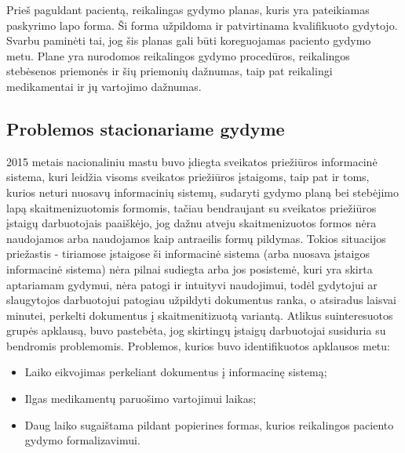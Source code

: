 Prieš paguldant pacientą, reikalingas gydymo planas, kuris yra pateikiamas paskyrimo lapo forma. Ši forma užpildoma ir patvirtinama kvalifikuoto gydytojo. Svarbu paminėti tai, jog šis planas gali būti koreguojamas paciento gydymo metu. Plane yra nurodomos reikalingos gydymo procedūros, reikalingos stebėsenos priemonės ir šių priemonių dažnumas, taip pat reikalingi medikamentai ir jų vartojimo dažnumas. 
\subsection{Problemos stacionariame gydyme}
2015 metais nacionaliniu mastu buvo įdiegta sveikatos priežiūros informacinė sistema, kuri leidžia visoms sveikatos priežiūros įstaigoms, taip pat ir toms, kurios neturi nuosavų informacinių sistemų, sudaryti gydymo planą bei stebėjimo lapą skaitmenizuotomis formomis, tačiau bendraujant su sveikatos priežiūros įstaigų darbuotojais paaiškėjo, jog dažnu atveju skaitmenizuotos formos nėra naudojamos arba naudojamos kaip antraeilis formų pildymas. Tokios situacijos priežastis - tiriamose įstaigose ši informacinė sistema (arba nuosava įstaigos informacinė sistema) nėra pilnai sudiegta arba jos posistemė, kuri yra skirta aptariamam gydymui, nėra patogi ir intuityvi naudojimui, todėl gydytojui ar slaugytojos darbuotojui patogiau užpildyti dokumentus ranka, o atsiradus laisvai minutei, perkelti dokumentus į skaitmenitizuotą variantą. Atlikus suinteresuotos grupės apklausą, buvo pastebėta, jog skirtingų įstaigų darbuotojai susiduria su bendromis problemomis. Problemos, kurios buvo identifikuotos apklausos metu: 
\begin{itemize}
    \item Laiko eikvojimas perkeliant dokumentus į informacinę sistemą;
    \item Ilgas medikamentų paruošimo vartojimui laikas;
    \item Daug laiko sugaištama pildant popierines formas, kurios reikalingos paciento gydymo formalizavimui.
\end{itemize}

